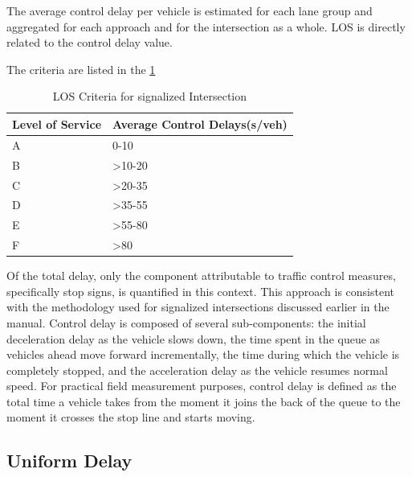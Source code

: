 The average control delay per vehicle is estimated for each 
lane group and aggregated for each approach and for the 
intersection as a whole. LOS is directly related to the 
control delay value.

The criteria are listed in the \cref{tab:hcm}
\begin{table}[h!]
    \centering
    \caption{LOS Criteria for signalized  Intersection}
    \begin{tabular}{|l|l|}
        \hline
        Level of Service	& Average Control Delays(s/veh)\\
        \hline
        A &	0-10 \\
        \hline
        B &	>10-20 \\
        \hline
        C &	>20-35 \\
        \hline
        D &	>35-55 \\
        \hline
        E &	>55-80 \\
        \hline
        F &	>80 \\
        \hline

        
    \end{tabular}
\label{tab:hcm}
\end{table}

Of the total delay, only the component attributable to 
traffic control measures, specifically stop signs, is 
quantified in this context. This approach is consistent 
with the methodology used for signalized intersections 
discussed earlier in the manual. Control delay is composed 
of several sub-components: the initial deceleration delay as 
the vehicle slows down, the time spent in the queue as 
vehicles ahead move forward incrementally, the time during 
which the vehicle is completely stopped, and the acceleration 
delay as the vehicle resumes normal speed. For practical 
field measurement purposes, control delay is defined as the 
total time a vehicle takes from the moment it joins the back 
of the queue to the moment it crosses the stop line and 
starts moving.

\subsection{Uniform Delay}

